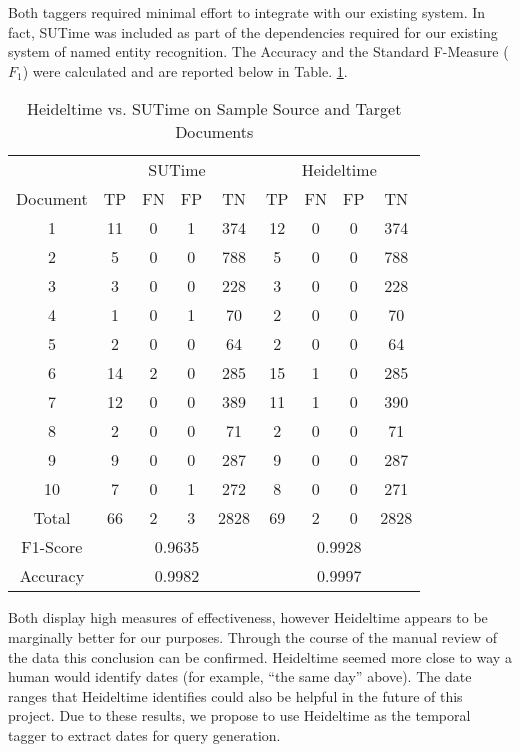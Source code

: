 \documentclass{mprop}
\begin{document}
Both taggers required minimal effort to integrate with our existing system. In fact, SUTime was included as part of the dependencies required for our existing system of named entity recognition. The Accuracy and the Standard F-Measure (\textbf{$ F_1 $}) were calculated and are reported below in Table. \ref{temporalcomparison}.
\begin{table}[H]
\centering
\begin{tabular}{|c|c|c|c|c|c|c|c|c|}
\hline
& \multicolumn{4}{|c|}{SUTime}    & \multicolumn{4}{|c|}{Heideltime} \\ 
\cline{2-9}
Document & TP  & FN & FP & TN     & TP & FN & FP & TN    \\ \hline
1        & 11  & 0  & 1  & 374	  & 12 & 0  & 0  & 374   \\ \hline
2        & 5   & 0  & 0	 & 788 	  & 5  & 0  & 0  & 788   \\ \hline
3		     & 3   & 0  & 0  & 228		& 3  & 0  & 0  & 228 	 \\ \hline
4        & 1   & 0  & 1	 & 70  		& 2  & 0  & 0  & 70  	 \\ \hline
5	       & 2   & 0  & 0	 & 64  		& 2	 & 0  & 0  & 64    \\ \hline
6		     & 14  & 2  & 0	 & 285 		& 15 & 1  & 0  & 285   \\ \hline
7		     & 12  & 0  & 0	 & 389 		& 11 & 1  & 0  & 390 	 \\ \hline
8		     & 2   & 0  & 0	 & 71  	  & 2	 & 0  & 0  & 71  	 \\ \hline
9		     & 9   & 0  & 0	 & 287 		& 9	 & 0  & 0  & 287 	 \\ \hline
10		   & 7   & 0  & 1	 & 272 		& 8	 & 0  & 0  & 271 	 \\ \hline
Total    & 66  & 2  & 3	 & 2828	  & 69 & 2  & 0  & 2828  \\ \hline
F1-Score & \multicolumn{4}{|c|}{0.9635} & \multicolumn{4}{|c|}{0.9928} \\ \hline
Accuracy & \multicolumn{4}{|c|}{0.9982} & \multicolumn{4}{|c|}{0.9997} \\ \hline
\end{tabular}
\caption{Heideltime vs. SUTime on Sample Source and Target Documents}
\label{temporalcomparison}
\end{table}
Both display high measures of effectiveness, however Heideltime appears to be marginally better for our purposes. 
Through the course of the manual review of the data this conclusion can be confirmed. 
Heideltime seemed more close to way a human would identify dates (for example, ``the same day'' above). 
The date ranges that Heideltime identifies could also be helpful in the future of this project. 
Due to these results, we propose to use Heideltime as the temporal tagger to extract dates for query generation.
\end{document}
